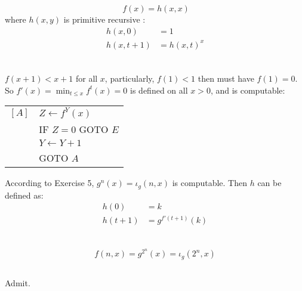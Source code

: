 \subsection{}
\[\ f(x) = h(x, x) \]
where $h(x,y)$ is primitive recursive :
\begin{align*}
  h(x, 0)   & = 1 \\
  h(x, t+1) & = {h(x, t)}^{x} \\
\end{align*}


\subsection{}
$ f(x+1) < x+1 $ for all $x$, particularly, $ f(1) < 1 $ then must have
 $ f(1) = 0 $. So $ f'(x) = \min _{t\le x} f^{t}(x) = 0 $ is defined on
all $ x>0 $, and is computable:
\begin{center}
\begin{tabular}{ll}
  $[A]$ & $ Z \gets f^{Y}(x) $ \\
        & IF $Z = 0$ GOTO $E$ \\
        & $ Y \gets Y + 1 $ \\
        & GOTO $A$
\end{tabular}
\end{center}
According to Exercise 5, $ g^{n}(x) = \iota_{g}(n, x) $ is computable.
Then $h$ can be defined as:
\begin{align*}
  h(0)   & = k \\
  h(t+1) & = g^{f'(t+1)}(k) \\
\end{align*}


\subsection{}
\[ f(n, x) = g^{2^{n}}(x) = \iota_{g}(2^{n}, x) \]

\subsection{}
Admit.

